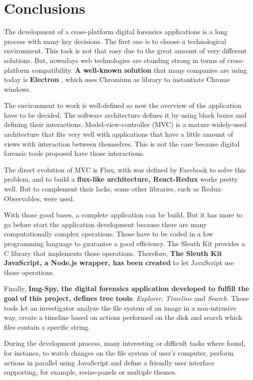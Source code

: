 \cleardoublepage
{}
\chapter*{Conclusions}

The development of a cross-platform digital forensics applications is a long
process with many key decisions. The first one is to choose a technological
environment. This task is not that easy due to the great amount of very
different solutions. But, nowadays web technologies are standing strong in
terms of cross-platform compatibility. \textbf{A well-known solution} that many
companies are using today is \textbf{Electron} \cite{electron-web}, which uses
Chromium as library to instantiate Chrome windows. 

The environment to work is well-defined so now the overview of the application
have to be decided. The software architecture defines it by using black boxes
and defining their interactions. Model-view-controller (MVC) is a mature
widely-used architecture that fits very well with applications that have a
little amount of views with interaction between themselves. This is not the
case because digital forensic tools proposed have those interactions.

The direct evolution of MVC is Flux, with was defined by Facebook to solve this
problem, and to build a \textbf{flux-like architecture, React-Redux} works
pretty well. But to complement their lacks, some other libraries, such as
Redux-Observables, were used.

With those good bases, a complete application can be build. But it has more to 
go before start the application development because there are many
computationally complex operations. Those have to be coded in a low programming
language to guarantee a good efficiency. The Sleuth Kit provides a C library
that implements those operations. Therefore, \textbf{The Sleuth Kit JavaScript,
a Node.js wrapper, has been created} to let JavaScript use those operations.

Finally, \textbf{Img-Spy, the digital forensics application developed to fulfill
the goal of this project, defines tree tools}: \textit{Explorer},
\textit{Timeline} and \textit{Search}. Those tools let an investigator analyze
the file system of an image in a non-intrusive way, create a timeline based on
actions performed on the disk and search which files contain a specific string.

During the development process, many interesting or difficult tasks where found,
for instance, to watch changes on the file system of user's computer, perform
actions in parallel using JavaScript and define a friendly user interface
supporting, for example, resize-panels or multiple themes.

